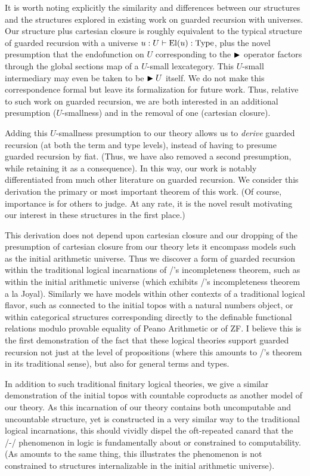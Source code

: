 It is worth noting explicitly the similarity and differences between our structures and the structures explored in existing work on guarded recursion with universes. Our structure plus cartesian closure is roughly equivalent to the typical structure of guarded recursion with a universe $u : U \vdash \operatorname{El}(u) : \mathrm{Type}$, plus the novel presumption that the endofunction on $U$ corresponding to the $\blacktriangleright$ operator factors through the global sections map of a $U$-small lexcategory. This $U$-small intermediary may even be taken to be $\blacktriangleright U$ itself. We do not make this correspondence formal but leave its formalization for future work. Thus, relative to such work on guarded recursion, we are both interested in an additional presumption ($U$-smallness) and in the removal of one (cartesian closure).

Adding this $U$-smallness presumption to our theory allows us to \emph{derive} guarded recursion (at both the term and type levels), instead of having to presume guarded recursion by fiat. (Thus, we have also removed a second presumption, while retaining it as a consequence). In this way, our work is notably differentiated from much other literature on guarded recursion. We consider this derivation the primary or most important theorem of this work. (Of course, importance is for others to judge. At any rate, it is the novel result motivating our interest in these structures in the first place.)

This derivation does not depend upon cartesian closure and our dropping of the presumption of cartesian closure from our theory lets it encompass models such as the initial arithmetic universe. Thus we discover a form of guarded recursion within the traditional logical incarnations of \Goedel/'s incompleteness theorem, such as within the initial arithmetic universe (which exhibits \Goedel/'s incompleteness theorem a la Joyal). Similarly we have models within other contexts of a traditional logical flavor, such as connected to the initial topos with a natural numbers object, or within categorical structures corresponding directly to the definable functional relations modulo provable equality of Peano Arithmetic or of ZF. I believe this is the first demonstration of the fact that these logical theories support guarded recursion not just at the level of propositions (where this amounts to \Loeb/'s theorem in its traditional sense), but also for general terms and types.

In addition to such traditional finitary logical theories, we give a similar demonstration of the initial topos with countable coproducts as another model of our theory. As this incarnation of our theory contains both uncomputable and uncountable structure, yet is constructed in a very similar way to the traditional logical incarnations, this should vividly dispel the oft-repeated canard that the \Godel/-\Lob/ phenomenon in logic is fundamentally about or constrained to computability. (As amounts to the same thing, this illustrates the phenomenon is not constrained to structures internalizable in the initial arithmetic universe).

